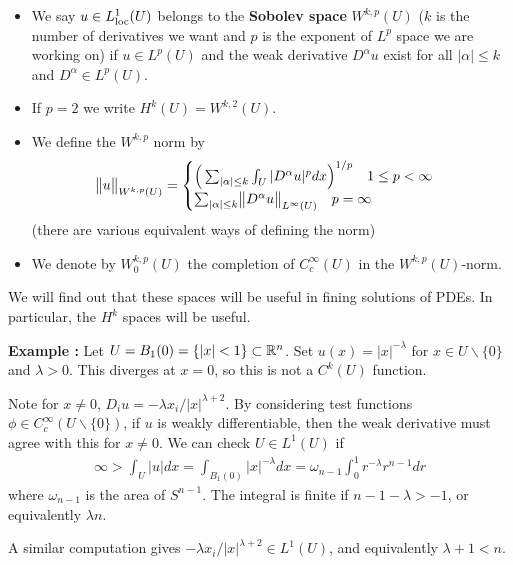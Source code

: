 \documentclass[10pt,a4paper]{report}
\begin{document}
\s
{} \begin{itemize}
\item We say $u \in L^1_{\text{loc}} (U)$ belongs to the \textbf{Sobolev space} $W^{k,p}(U)$ ($k$ is the number of derivatives we want and $p$ is the exponent of $L^p$ space we are working on) if $u\in L^p(U)$ and the weak derivative $D^{\alpha} u$ exist for all $|\alpha| \leq k$ and $D^{\alpha} \in L^p(U)$.
\item If $p=2$ we write $H^k(U) = W^{k,2}(U)$.
\item We define the $W^{k,p}$ norm by
\begin{align*}
\bigl\lVert u\bigr\rVert_{W^{k,p}(U)} = \begin{cases}
\Big( \sum_{|\alpha|\leq k} \int_U |D^{\alpha} u|^p dx \Big)^{1/p} \quad 1\leq p <\infty \\
\sum_{|\alpha|\leq k} \bigl\lVert D^{\alpha} u \bigr\rVert_{L^{\infty}(U)} \quad p =\infty
\end{cases}
\end{align*}
(there are various equivalent ways of defining the norm)
\item We denote by $W_0^{k,p}(U)$ the completion of $C_c^{\infty}(U)$ in the $W^{k,p}(U)$-norm.
\end{itemize} 
\s

We will find out that these spaces will be useful in fining solutions of PDEs. In particular, the $H^k$ spaces will be useful.
\s

\textbf{Example :} Let $U = B_1(0) = \{ |x| <1 \} \subset \mathbb{R}^n$. Set $u(x) = |x|^{-\lambda}$ for $x\in U \backslash \{0\}$ and $\lambda >0$. This diverges at $x=0$, so this is not a $C^{k}(U)$ function.

\quad Note for $x\neq 0$, $D_i u = - \lambda x_i /|x|^{\lambda +2}$. By considering test functions $\phi \in C_c^{\infty}(U \backslash \{0\})$, if $u$ is weakly differentiable, then the weak derivative must agree with this for $x\neq 0$. We can check $U\in L^1(U)$ if
\begin{align*}
\infty > \int_U |u| dx = \int_{B_1(0)} |x|^{-\lambda} dx = \omega_{n-1} \int_0^1 r^{-\lambda} r^{n-1} dr
\end{align*}
where $\omega_{n-1}$ is the area of $S^{n-1}$. The integral is finite if $n-1-\lambda >-1$, or equivalently $\lambda n$.

\quad A similar computation gives $- \lambda x_i/|x|^{\lambda +2} \in L^1(U)$, and equivalently $\lambda +1 <n$.
\end{document}
